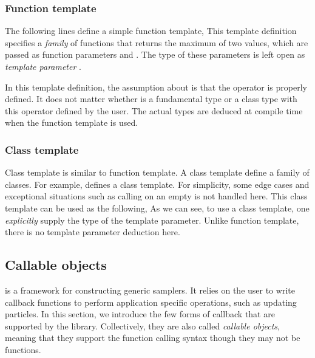 \subsubsection{Function template}
\label{ssub:Function template}

The following lines define a simple function template,
This template definition specifies a \emph{family} of functions that returns the maximum of two values, which are passed as function parameters  and . The type of these parameters is left open as \emph{template parameter} .

In this template definition, the assumption about  is that the operator \cppinline{<} is properly defined. It does not matter whether  is a fundamental type or a class type with this operator defined by the user. The actual types are deduced at compile time when the function template is used.

\subsubsection{Class template}
\label{ssub:Class template}

Class template is similar to function template. A class template define a family of classes. For example,
defines a  class template. For simplicity, some edge cases and exceptional situations such as calling  on an empty  is not handled here. This class template can be used as the following,
As we can see, to use a class template, one \emph{explicitly} supply the type of the template parameter. Unlike function template, there is no template parameter deduction here.

\subsection{Callable objects}
\label{sub:Callable objects}

\vsmc is a framework for constructing generic \smc samplers. It relies on the user to write callback functions to perform application specific operations, such as updating particles. In this section, we introduce the few forms of callback that are supported by the library. Collectively, they are also called \emph{callable objects}, meaning that they support the function calling syntax though they may not be functions.

